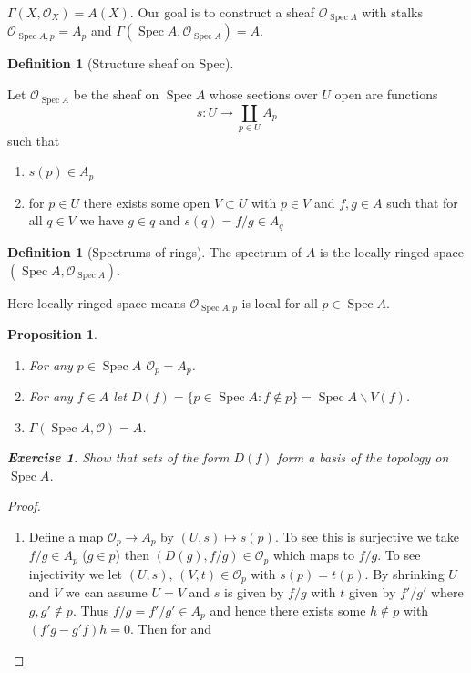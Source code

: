 \documentclass[10pt,]{book}
\theoremstyle{plain}
\newtheorem{proposition}[theorem]{Proposition}
\theoremstyle{definition}
\newtheorem{definition}[theorem]{Definition}
\newtheorem{exercise}[theorem]{Exercise}
\numberwithin{equation}{section}
\newcommand{\sO}{\mathcal{O}}
\DeclareMathOperator{\Spec}{Spec}
\begin{document}
          \(\Gamma(X,\sO_X) = A(X)\).
          Our goal is to construct a sheaf \(\sO_{\Spec A}\) with stalks \(\sO_{\Spec A, p} = A_p\) and \(\Gamma(\Spec A, \sO_{\Spec A}) = A\).
\begin{definition}[Structure sheaf on Spec]\label{definition-4}

            Let \(\sO_{\Spec A}\) be the sheaf on \(\Spec A\) whose sections over \(U\) open are functions \[s\colon U \to \coprod_{p\in U} A_p\]
            such that
            \begin{enumerate}
\item{}\(s(p)\in A_p\)\item{}for \(p\in U\) there exists some open \(V \subset U\) with \(p\in V\) and \(f,g\in A\) such that for all \(q\in V\) we have \(g\in q\) and \(s(q) = f/g \in A_q\)\end{enumerate}
\end{definition}
\begin{definition}[Spectrums of rings]\label{definition-5}
The spectrum of \(A\) is the locally ringed space \((\Spec A,\sO_{\Spec A})\).\end{definition}
\par
Here locally ringed space means \(\sO_{\Spec A,p}\) is local for all \(p\in \Spec A\).%
\begin{proposition}\label{proposition-1}
\begin{enumerate}
\item{}For any \(p\in \Spec A\) \(\sO_p = A_p\).\item{}For any \(f\in A\) let \(D(f) = \{p\in \Spec A : f\notin p\} = \Spec A \smallsetminus V(f)\).\item{}\(\Gamma(\Spec A,\sO) = A\).\end{enumerate}
\begin{exercise}\label{exercise-3}
Show that sets of the form \(D(f)\) form a basis of the topology on \(\Spec A\).\end{exercise}
\end{proposition}
\begin{proof}
\begin{enumerate}
\item{}Define a map \(\sO_p\to A_p\) by \((U,s)\mapsto s(p)\).
                To see this is surjective we take \(f/g\in A_p\) (\(g\in p\)) then \((D(g),f/g) \in \sO_p\) which maps to \(f/g\).
                To see injectivity we let \((U,s),\,(V,t) \in \sO_p\) with \(s(p) = t(p)\).
                By shrinking \(U\) and \(V\) we can assume \(U = V\) and \(s\) is given by \(f/g\) with \(t\) given by \(f'/g'\) where \(g,g'\notin p\).
                Thus \(f/g = f'/g' \in A_p\) and hence there exists some \(h\notin p\) with \((f'g - g'f)h = 0\).
                Then for and
                
              \end{enumerate}
\end{proof}
\end{document}
